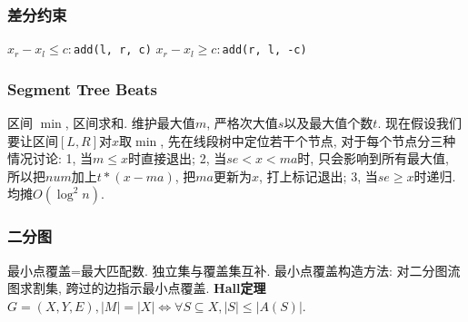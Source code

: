 \subsubsection{差分约束}
$x_r - x_l \leq c:$\texttt{add(l, r, c)}
$x_r - x_l \geq c:$\texttt{add(r, l, -c)}

\subsubsection{Segment Tree Beats}
        区间 $\min$, 区间求和. 维护最大值$m$, 严格次大值$s$以及最大值个数$t$. 现在假设我们要让区间$[L,R]$对$x$取$\min$, 先在线段树中定位若干个节点, 对于每个节点分三种情况讨论: 1, 当$m\leq x$时直接退出; 2, 当$se<x<ma$时, 只会影响到所有最大值, 所以把$num$加上$t*(x-ma)$, 把$ma$更新为$x$, 打上标记退出; 3, 当$se\geq x$时递归. 均摊$O(\log^2n)$. 
\subsubsection{二分图}
        最小点覆盖=最大匹配数. 独立集与覆盖集互补. 最小点覆盖构造方法: 对二分图流图求割集, 跨过的边指示最小点覆盖.
        \textbf{Hall定理}$G=(X,Y,E), |M|=|X| \Leftrightarrow \forall S \subseteq X, |S| \leq |A(S)|$. 

